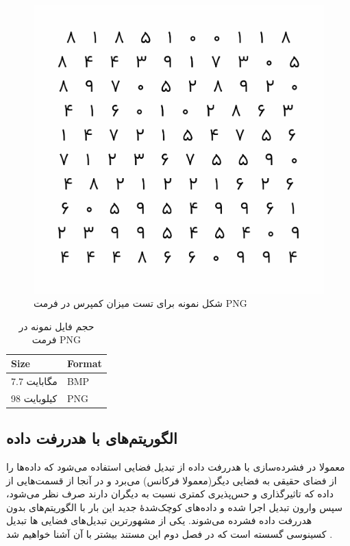 \begin{figure}[H]
	\centering
	\includegraphics[scale=0.6]{figs/compressed.png}
	\caption[شکل نمونه برای تست میزان کمپرس در فرمت PNG ]{شکل نمونه برای تست میزان کمپرس در فرمت PNG \cite{my_picture}}
	\label{example_1}
\end{figure}

\begin{table}[H]
	\centering
	\caption{حجم فایل نمونه در فرمت PNG }
	\label{compare_1}
	\begin{tabular}{@{}ll@{}}
	\toprule
	Size & Format \\ \midrule
	7.7 مگابایت & BMP \\
	98 کیلوبایت & PNG \\ \bottomrule
	\end{tabular}
\end{table}



\subsection{الگوریتم‌های با هدررفت داده}

معمولا در فشرده‌سازی با هدررفت داده از تبدیل‌‌ فضایی 
استفاده می‌شود که داده‌ها را از فضای حقیقی به فضایی دیگر(معمولا فرکانس) می‌برد و در آنجا از قسمت‌هایی از داده که تاثیرگذاری و حس‌پذیری کمتری
نسبت به دیگران دارند صرف نظر می‌شود، سپس وارون تبدیل اجرا شده و داده‌های کوچک‌شدهٔ جدید این بار با الگوریتم‌های 
بدون هدررفت داده فشرده می‌شوند. یکی از 
مشهورترین
تبدیل‌های فضایی
ها تبدیل کسینوسی گسسته
است که در فصل‌ دوم این مستند بیشتر با آن آشنا خواهیم شد
\cite{dct}.

